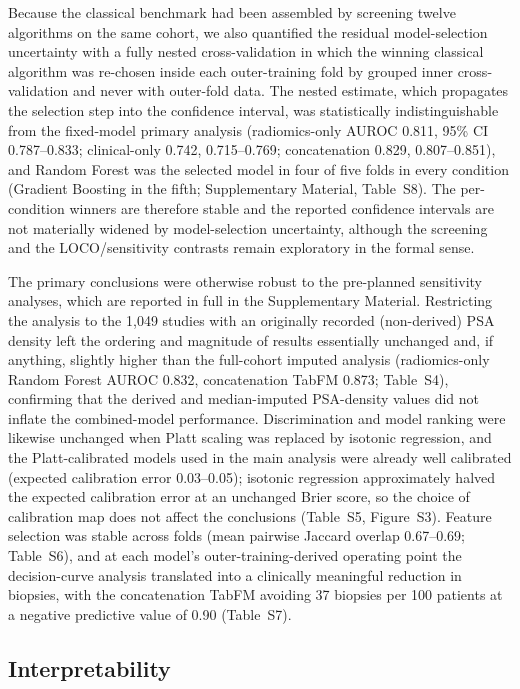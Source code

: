 \documentclass[11pt]{article}
\begin{document}
Because the classical benchmark had been assembled by screening twelve algorithms on
the same cohort, we also quantified the residual model-selection uncertainty with a
fully nested cross-validation in which the winning classical algorithm was re-chosen
inside each outer-training fold by grouped inner cross-validation and never with
outer-fold data. The nested estimate, which propagates the selection step into the
confidence interval, was statistically indistinguishable from the fixed-model primary
analysis (radiomics-only AUROC 0.811, 95\% CI 0.787--0.833; clinical-only 0.742,
0.715--0.769; concatenation 0.829, 0.807--0.851), and Random Forest was the selected
model in four of five folds in every condition (Gradient Boosting in the fifth;
Supplementary Material, Table~S8). The
per-condition winners are therefore stable and the reported confidence intervals are
not materially widened by model-selection uncertainty, although the screening and the
LOCO/sensitivity contrasts remain exploratory in the formal sense.

The primary conclusions were otherwise robust to the pre-planned sensitivity analyses,
which are reported in full in the Supplementary Material. Restricting the analysis to
the 1{,}049 studies with an originally recorded (non-derived) PSA density left the
ordering and magnitude of results essentially unchanged and, if anything, slightly
higher than the full-cohort imputed analysis (radiomics-only Random Forest AUROC 0.832,
concatenation TabFM 0.873; Table~S4), confirming that the derived and median-imputed
PSA-density values did not inflate the combined-model performance. Discrimination and
model ranking were likewise unchanged when Platt scaling was replaced by isotonic
regression, and the Platt-calibrated models used in the main analysis were already well
calibrated (expected calibration error 0.03--0.05); isotonic regression approximately
halved the expected calibration error at an unchanged Brier score, so the choice of
calibration map does not affect the conclusions (Table~S5, Figure~S3). Feature selection
was stable across folds (mean pairwise Jaccard overlap 0.67--0.69; Table~S6), and at
each model's outer-training-derived operating point the decision-curve analysis
translated into a clinically meaningful reduction in biopsies, with the concatenation
TabFM avoiding 37 biopsies per 100 patients at a negative predictive value of 0.90
(Table~S7).

\subsection{Interpretability}
\label{sec:res-interpret}
\end{document}
